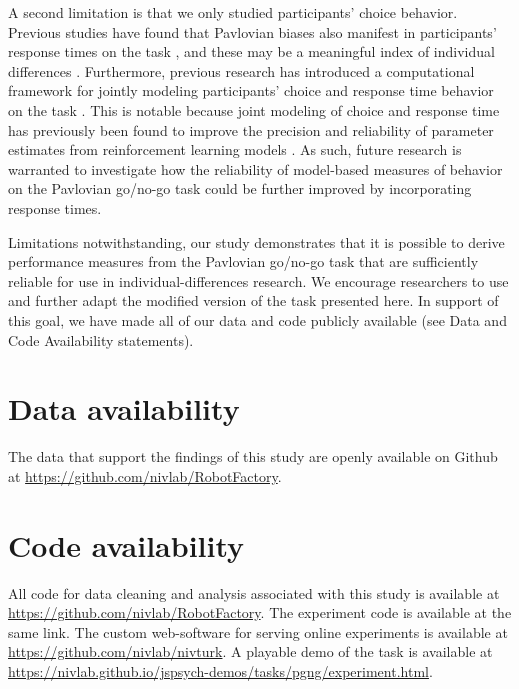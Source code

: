 \documentclass[a4paper,12pt]{article}
\begin{document}
\begin{refsection}[main]
A second limitation is that we only studied participants' choice behavior. Previous studies have found that Pavlovian biases also manifest in participants' response times on the task \cite{millner2018pavlovian, algermissen2022striatal}, and these may be a meaningful index of individual differences \cite{betts2020learning, millner2019suicidal, scholz2020dissociable}. Furthermore, previous research has introduced a computational framework for jointly modeling participants' choice and response time behavior on the task \cite{millner2018pavlovian, millner2019suicidal}. This is notable because joint modeling of choice and response time has previously been found to improve the precision and reliability of parameter estimates from reinforcement learning models \cite{ballard2019joint, shahar2019improving}. As such, future research is warranted to investigate how the reliability of model-based measures of behavior on the Pavlovian go/no-go task could be further improved by incorporating response times. 

Limitations notwithstanding, our study demonstrates that it is possible to derive performance measures from the Pavlovian go/no-go task that are sufficiently reliable for use in individual-differences research. We encourage researchers to use and further adapt the modified version of the task presented here. In support of this goal, we have made all of our data and code publicly available (see Data and Code Availability statements).

\break
\section*{Data availability}

The data that support the findings of this study are openly available on Github at \url{https://github.com/nivlab/RobotFactory}.

\section*{Code availability}

All code for data cleaning and analysis associated with this study is available at \url{https://github.com/nivlab/RobotFactory}. The experiment code is available at the same link.  The custom web-software for serving online experiments is available at \url{https://github.com/nivlab/nivturk}. A playable demo of the task is available at \url{https://nivlab.github.io/jspsych-demos/tasks/pgng/experiment.html}.


\end{refsection}
\end{document}
